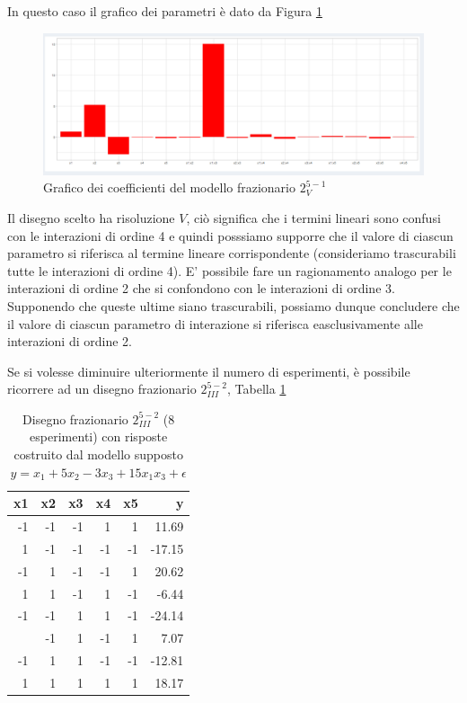 \documentclass[
  11pt,
]{book}
\begin{document}
In questo caso il grafico dei parametri è dato da Figura \ref{fig:fz12}

\begin{figure}[ht]

{\centering \includegraphics[width=1\linewidth]{Immagini/Fraz/12_Conf_ris5} 

}

\caption{Grafico dei coefficienti del modello frazionario $2^{5-1}_V$ }\label{fig:fz12}
\end{figure}

\newpage

Il disegno scelto ha risoluzione \(V\), ciò significa che i termini lineari sono confusi con le interazioni di ordine 4 e quindi posssiamo supporre che il valore di ciascun parametro si riferisca al termine lineare corrispondente (consideriamo trascurabili tutte le interazioni di ordine 4). E' possibile fare un ragionamento analogo per le interazioni di ordine 2 che si confondono con le interazioni di ordine 3. Supponendo che queste ultime siano trascurabili, possiamo dunque concludere che il valore di ciascun parametro di interazione si riferisca easclusivamente alle interazioni di ordine 2.

Se si volesse diminuire ulteriormente il numero di esperimenti, è possibile ricorrere ad un disegno frazionario \(2^{5-2}_{III}\), Tabella \ref{tab:Confris3}

\begin{table}

\caption{\label{tab:Confris3}Disegno frazionario $2^{5-2}_{III}$ (8 esperimenti) con risposte costruito dal modello supposto $y=x_1+5x_2-3x_3+15x_1x_3+\epsilon$}
\centering
\begin{tabular}[t]{rrrrrr}
\toprule
x1 & x2 & x3 & x4 & x5 & y\\
\midrule
-1 & -1 & -1 & 1 & 1 & 11.69\\
1 & -1 & -1 & -1 & -1 & -17.15\\
-1 & 1 & -1 & -1 & 1 & 20.62\\
1 & 1 & -1 & 1 & -1 & -6.44\\
-1 & -1 & 1 & 1 & -1 & -24.14\\
\addlinespace
1 & -1 & 1 & -1 & 1 & 7.07\\
-1 & 1 & 1 & -1 & -1 & -12.81\\
1 & 1 & 1 & 1 & 1 & 18.17\\
\bottomrule
\end{tabular}
\end{table}
\end{document}

